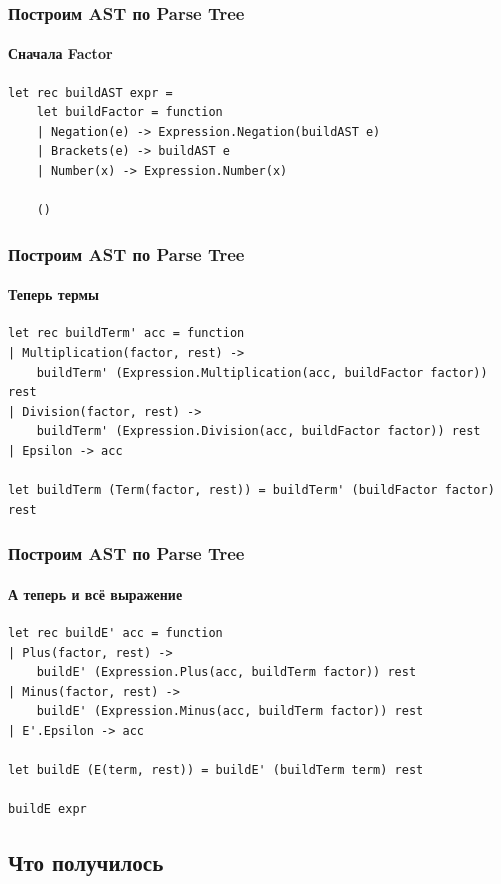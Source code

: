 \documentclass{../../slides-style}
\begin{document}
    \begin{frame}[fragile]
        \frametitle{Построим AST по Parse Tree}
        \framesubtitle{Сначала Factor}
        \begin{verbatim}
let rec buildAST expr =
    let buildFactor = function
    | Negation(e) -> Expression.Negation(buildAST e)
    | Brackets(e) -> buildAST e
    | Number(x) -> Expression.Number(x)

    ()
        \end{verbatim}
    \end{frame}

    \begin{frame}[fragile]
        \frametitle{Построим AST по Parse Tree}
        \framesubtitle{Теперь термы}
        \begin{verbatim}
let rec buildTerm' acc = function
| Multiplication(factor, rest) -> 
    buildTerm' (Expression.Multiplication(acc, buildFactor factor)) rest
| Division(factor, rest) -> 
    buildTerm' (Expression.Division(acc, buildFactor factor)) rest
| Epsilon -> acc

let buildTerm (Term(factor, rest)) = buildTerm' (buildFactor factor) rest
        \end{verbatim}
    \end{frame}

    \begin{frame}[fragile]
        \frametitle{Построим AST по Parse Tree}
        \framesubtitle{А теперь и всё выражение}
        \begin{verbatim}
let rec buildE' acc = function
| Plus(factor, rest) -> 
    buildE' (Expression.Plus(acc, buildTerm factor)) rest
| Minus(factor, rest) -> 
    buildE' (Expression.Minus(acc, buildTerm factor)) rest
| E'.Epsilon -> acc

let buildE (E(term, rest)) = buildE' (buildTerm term) rest

buildE expr
        \end{verbatim}
    \end{frame}

    \subsection{Что получилось}
\end{document}
